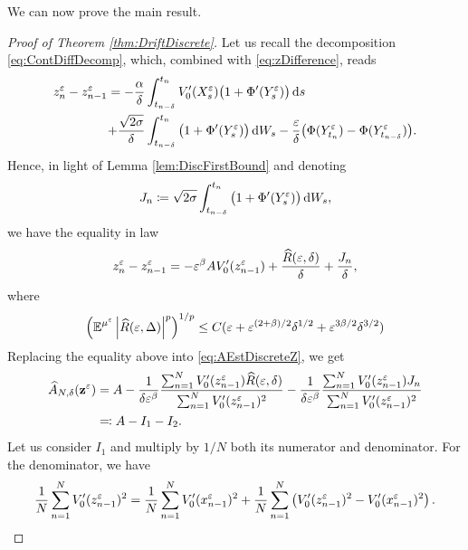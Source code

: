 \documentclass[10pt]{article}
\begin{document}
We can now prove the main result.
\begin{proof}[Proof of Theorem \ref{thm:DriftDiscrete}]  Let us recall the decomposition \eqref{eq:ContDiffDecomp}, which, combined with \eqref{eq:zDifference}, reads
	\begin{equation}
	\begin{aligned}
		z^\varepsilon_n - z^\varepsilon_{n-1} = - \frac{\alpha}{\delta} &\int_{t_{n-\delta}}^{t_n} V_0'(X^\varepsilon_s)\big(1 + \Phi'(Y^\varepsilon_s)\big)\,\mathrm{d} s \\
		+\frac{\sqrt{2\sigma}}{\delta} &\int_{t_{n-\delta}}^{t_n} \big(1 + \Phi'(Y^\varepsilon_s)\big) \,\mathrm{d} W_s -\frac{\varepsilon}{\delta} \big(\Phi(Y^\varepsilon_{t_n})- \Phi(Y^\varepsilon_{t_{n-\delta}})\big).
	\end{aligned}
	\end{equation}
	Hence, in light of Lemma \ref{lem:DiscFirstBound} and denoting 
	\begin{equation}
		J_n \coloneqq \sqrt{2\sigma}\int_{t_{n-\delta}}^{t_n} \big(1 + \Phi'(Y^\varepsilon_s)\big) \,\mathrm{d} W_s,
	\end{equation}
	we have the equality in law
	\begin{equation}
		z^\varepsilon_n - z^\varepsilon_{n-1} = -\varepsilon^\beta A V_0'(z^\varepsilon_{n-1}) + \frac{\widehat R(\varepsilon, \delta)}{\delta} + \frac{J_n}{\delta},
	\end{equation}
	where
	\begin{equation}
		\left(\operatorname{\mathbb{E}}^{\mu^\varepsilon} \left\lvert\widehat R(\varepsilon, \Delta)\right\rvert^p\right)^{1/p} \leq C(\varepsilon +  \varepsilon^{(2+\beta)/2}\delta^{1/2} + \varepsilon^{3\beta/2}\delta^{3/2})
	\end{equation}
	Replacing the equality above into \eqref{eq:AEstDiscreteZ}, we get
	\begin{equation}
	\begin{aligned}
		\widehat A_{N, \delta}(\mathbf z^\varepsilon) &= A -\frac{1}{\delta \varepsilon^\beta}\frac{\sum_{n=1}^{N}V_0'(z^\varepsilon_{n-1})\widehat R(\varepsilon, \delta)}{\sum_{n=1}^{N} V_0'(z^\varepsilon_{n-1})^2} - \frac{1}{\delta \varepsilon^\beta}\frac{\sum_{n=1}^{N}V_0'(z^\varepsilon_{n-1})J_n}{\sum_{n=1}^{N} V_0'(z^\varepsilon_{n-1})^2} \\
		&\eqqcolon A - I_1 - I_2.
	\end{aligned}
	\end{equation}
	Let us consider $I_1$ and multiply by $1/N$ both its numerator and denominator. For the denominator, we have
	\begin{equation}
		\frac1N \sum_{n=1}^{N} V_0'(z^\epl_{n-1})^2 = \frac1N \sum_{n=1}^{N} V_0'(x^\epl_{n-1})^2 + \frac1N \sum_{n=1}^{N} \left(V_0'(z^\epl_{n-1})^2 - V_0'(x^\epl_{n-1})^2\right).

\end{equation}
\end{proof}
\end{document}
